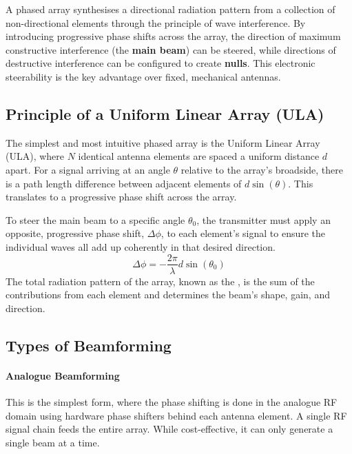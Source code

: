 \begin{keyconcept}
    A phased array synthesises a directional radiation pattern from a collection of non-directional elements through the principle of wave interference. By introducing progressive phase shifts across the array, the direction of maximum constructive interference (the \textbf{main beam}) can be steered, while directions of destructive interference can be configured to create \textbf{nulls}. This electronic steerability is the key advantage over fixed, mechanical antennas.
\end{keyconcept}

\subsection{Principle of a Uniform Linear Array (ULA)}

The simplest and most intuitive phased array is the Uniform Linear Array (ULA), where \(N\) identical antenna elements are spaced a uniform distance \(d\) apart. For a signal arriving at an angle \(\theta\) relative to the array's broadside, there is a path length difference between adjacent elements of \(d \sin(\theta)\). This translates to a progressive phase shift across the array.

To steer the main beam to a specific angle \(\theta_0\), the transmitter must apply an opposite, progressive phase shift, \(\Delta\phi\), to each element's signal to ensure the individual waves all add up coherently in that desired direction.
\begin{equation}
    \Delta\phi = -\frac{2\pi}{\lambda} d \sin(\theta_0)
\end{equation}
The total radiation pattern of the array, known as the , is the sum of the contributions from each element and determines the beam's shape, gain, and direction.

\subsection{Types of Beamforming}

\paragraph{Analogue Beamforming}
This is the simplest form, where the phase shifting is done in the analogue RF domain using hardware phase shifters behind each antenna element. A single RF signal chain feeds the entire array. While cost-effective, it can only generate a single beam at a time.

